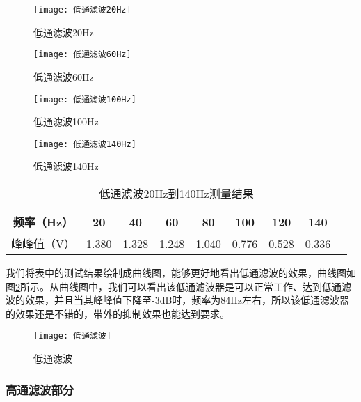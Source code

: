 \documentclass{zjureport}
\begin{document}
	\begin{figure}[h]
		\centering
		\begin{minipage}[t]{0.49\linewidth}%
			\texttt{[image: 低通滤波20Hz]}%
			\caption{低通滤波20Hz}
			\label{低通滤波20Hz}
		\end{minipage}%
		\begin{minipage}[t]{0.49\linewidth}
			\texttt{[image: 低通滤波60Hz]}
			\caption{低通滤波60Hz}
			\label{低通滤波60Hz}
		\end{minipage}
	
		\begin{minipage}[t]{0.49\linewidth}%
			\texttt{[image: 低通滤波100Hz]}%
			\caption{低通滤波100Hz}
			\label{低通滤波100Hz}
		\end{minipage}%
		\begin{minipage}[t]{0.49\linewidth}%
			\texttt{[image: 低通滤波140Hz]}%
			\caption{低通滤波140Hz}
			\label{低通滤波140Hz}
		\end{minipage}%
	\end{figure}

	\begin{table}[htbp]
		\centering
		\begin{tabular}{ c|c|c|c|c|c|c|c p{1.5cm}|}
			\hline
			频率（Hz） & 20 & 40 & 60 & 80 & 100 & 120 & 140 \\
			\hline
			峰峰值（V）  & 1.380 & 1.328 & 1.248 & 1.040 & 0.776 & 0.528 & 0.336 \\
			\hline
		\end{tabular}
		\caption{低通滤波20Hz到140Hz测量结果}\label{低通滤波20Hz到140Hz测量结果}
	\end{table}

	我们将表中的测试结果绘制成曲线图，能够更好地看出低通滤波的效果，曲线图如图\ref{低通滤波}所示。从曲线图中，我们可以看出该低通滤波器是可以正常工作、达到低通滤波的效果，并且当其峰峰值下降至-3dB时，频率为84Hz左右，所以该低通滤波器的效果还是不错的，带外的抑制效果也能达到要求。
	
	\begin{figure}[h]
		\centering%
		\texttt{[image: 低通滤波]}
		\caption{低通滤波}%
		\label{低通滤波}%
	\end{figure}

	
	\subsubsection{高通滤波部分}
\end{document}
